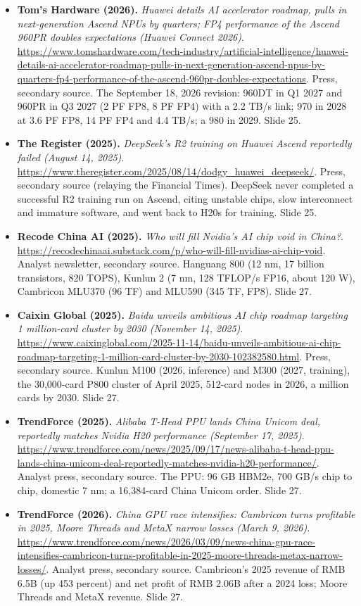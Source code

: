\begin{itemize}[leftmargin=1.2em,itemsep=3pt]
\item \textbf{Tom's Hardware (2026).} \textit{Huawei details AI accelerator roadmap, pulls in next-generation Ascend NPUs by quarters; FP4 performance of the Ascend 960PR doubles expectations (Huawei Connect 2026)}. \url{https://www.tomshardware.com/tech-industry/artificial-intelligence/huawei-details-ai-accelerator-roadmap-pulls-in-next-generation-ascend-npus-by-quarters-fp4-performance-of-the-ascend-960pr-doubles-expectations}. Press, secondary source. The September 18, 2026 revision: 960DT in Q1 2027 and 960PR in Q3 2027 (2 PF FP8, 8 PF FP4) with a 2.2 TB/s link; 970 in 2028 at 3.6 PF FP8, 14 PF FP4 and 4.4 TB/s; a 980 in 2029. Slide 25.
\item \textbf{The Register (2025).} \textit{DeepSeek's R2 training on Huawei Ascend reportedly failed (August 14, 2025)}. \url{https://www.theregister.com/2025/08/14/dodgy_huawei_deepseek/}. Press, secondary source (relaying the Financial Times). DeepSeek never completed a successful R2 training run on Ascend, citing unstable chips, slow interconnect and immature software, and went back to H20s for training. Slide 25.
\item \textbf{Recode China AI (2025).} \textit{Who will fill Nvidia's AI chip void in China?}. \url{https://recodechinaai.substack.com/p/who-will-fill-nvidias-ai-chip-void}. Analyst newsletter, secondary source. Hanguang 800 (12 nm, 17 billion transistors, 820 TOPS), Kunlun 2 (7 nm, 128 TFLOP/s FP16, about 120 W), Cambricon MLU370 (96 TF) and MLU590 (345 TF, FP8). Slide 27.
\item \textbf{Caixin Global (2025).} \textit{Baidu unveils ambitious AI chip roadmap targeting 1 million-card cluster by 2030 (November 14, 2025)}. \url{https://www.caixinglobal.com/2025-11-14/baidu-unveils-ambitious-ai-chip-roadmap-targeting-1-million-card-cluster-by-2030-102382580.html}. Press, secondary source. Kunlun M100 (2026, inference) and M300 (2027, training), the 30,000-card P800 cluster of April 2025, 512-card nodes in 2026, a million cards by 2030. Slide 27.
\item \textbf{TrendForce (2025).} \textit{Alibaba T-Head PPU lands China Unicom deal, reportedly matches Nvidia H20 performance (September 17, 2025)}. \url{https://www.trendforce.com/news/2025/09/17/news-alibaba-t-head-ppu-lands-china-unicom-deal-reportedly-matches-nvidia-h20-performance/}. Analyst press, secondary source. The PPU: 96 GB HBM2e, 700 GB/s chip to chip, domestic 7 nm; a 16,384-card China Unicom order. Slide 27.
\item \textbf{TrendForce (2026).} \textit{China GPU race intensifies: Cambricon turns profitable in 2025, Moore Threads and MetaX narrow losses (March 9, 2026)}. \url{https://www.trendforce.com/news/2026/03/09/news-china-gpu-race-intensifies-cambricon-turns-profitable-in-2025-moore-threads-metax-narrow-losses/}. Analyst press, secondary source. Cambricon's 2025 revenue of RMB 6.5B (up 453 percent) and net profit of RMB 2.06B after a 2024 loss; Moore Threads and MetaX revenue. Slide 27.

\end{itemize}
